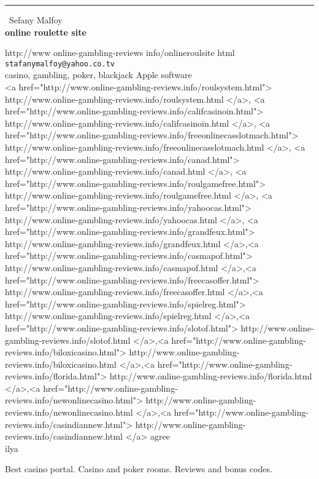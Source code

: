 \documentclass{report}
\begin{document}
\begin{center}
\rule{6in}{1pt} \
{\large Sefany Malfoy \\
{\bf online roulette site}}

http://www online-gambling-reviews info/onlineroulsite html
\\
{\tt stafanymalfoy@yahoo.co.tv}\\
casino, gambling, poker, blackjack Apple software\\
<a href="http://www.online-gambling-reviews.info/roulsystem.html"> http://www.online-gambling-reviews.info/roulsystem.html </a>, <a href="http://www.online-gambling-reviews.info/califcasinoin.html"> http://www.online-gambling-reviews.info/califcasinoin.html </a>, <a href="http://www.online-gambling-reviews.info/freeonlinecasslotmach.html"> http://www.online-gambling-reviews.info/freeonlinecasslotmach.html </a>, <a href="http://www.online-gambling-reviews.info/canad.html"> http://www.online-gambling-reviews.info/canad.html </a>, <a href="http://www.online-gambling-reviews.info/roulgamefree.html"> http://www.online-gambling-reviews.info/roulgamefree.html </a>, <a href="http://www.online-gambling-reviews.info/yahoocas.html"> http://www.online-gambling-reviews.info/yahoocas.html </a>, <a href="http://www.online-gambling-reviews.info/grandfeux.html"> http://www.online-gambling-reviews.info/grandfeux.html </a>,<a href="http://www.online-gambling-reviews.info/casmapof.html"> http://www.online-gambling-reviews.info/casmapof.html </a>,<a href="http://www.online-gambling-reviews.info/freecasoffer.html"> http://www.online-gambling-reviews.info/freecasoffer.html </a>,<a href="http://www.online-gambling-reviews.info/spielreg.html"> http://www.online-gambling-reviews.info/spielreg.html </a>,<a href="http://www.online-gambling-reviews.info/slotof.html"> http://www.online-gambling-reviews.info/slotof.html </a>,<a href="http://www.online-gambling-reviews.info/biloxicasino.html"> http://www.online-gambling-reviews.info/biloxicasino.html </a>,<a href="http://www.online-gambling-reviews.info/florida.html"> http://www.online-gambling-reviews.info/florida.html </a>,<a href="http://www.online-gambling-reviews.info/newonlinecasino.html"> http://www.online-gambling-reviews.info/newonlinecasino.html </a>,<a href="http://www.online-gambling-reviews.info/casindiannew.html"> http://www.online-gambling-reviews.info/casindiannew.html </a> agree\\
	ilya\end{center}

Best casino portal. Casino and poker rooms. Reviews and bonus codes.
\end{document}
